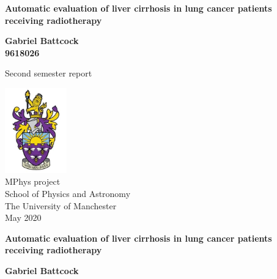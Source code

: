 \documentclass[12pt]{article}
\begin{document}
\begin{titlepage}
    \begin{center}
        \vspace*{1cm}
        
        \Huge
        \textbf{Automatic evaluation of liver cirrhosis in lung cancer patients receiving radiotherapy}

        \vspace{1.5cm}
        
        \LARGE
        \textbf{Gabriel Battcock}\\
        \textbf{9618026}
        
        \vfill
        
        Second semester report
        
        \vspace{0.8cm}
        
        \includegraphics[width=0.2\textwidth]{graphics/UomCrest.jpg}\\
        \large
        MPhys project\\
        School of Physics and Astronomy\\
        The University of Manchester\\
        May 2020
        
    \end{center}

\end{titlepage}

\thispagestyle{empty}
    \begin{center}
        \Large
        \textbf{Automatic evaluation of liver cirrhosis in lung cancer patients receiving radiotherapy}
        
        \large
        \vspace{0.4cm}
        \textbf{Gabriel Battcock}
    \end{center}
    
\end{document}
